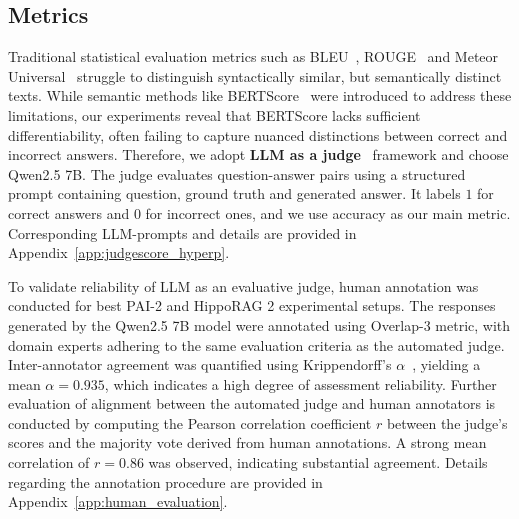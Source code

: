 \subsection{Metrics}

Traditional statistical evaluation metrics such as BLEU~\cite{papineni2002bleu}, ROUGE~\cite{lin2004rouge} and Meteor Universal~\cite{denkowski2014meteor} struggle to distinguish syntactically similar, but semantically distinct texts. While semantic methods like BERTScore~\cite{zhang2019bertscore} were introduced to address these limitations, our experiments reveal that BERTScore lacks sufficient differentiability, often failing to capture nuanced distinctions between correct and incorrect answers. Therefore, we adopt \textbf{LLM as a judge}~\cite{zheng2023judging} framework and choose Qwen2.5 7B. The judge evaluates question-answer pairs using a structured prompt containing question, ground truth and generated answer. It labels $1$ for correct answers and $0$ for incorrect ones, and we use accuracy as our main metric. Corresponding LLM-prompts and details are provided in Appendix~\ref{app:judgescore_hyperp}.

To validate reliability of LLM as an evaluative judge, human annotation was conducted for best PAI-2 and HippoRAG 2 experimental setups. The responses generated by the Qwen2.5 7B model were annotated using Overlap-3 metric, with domain experts adhering to the same evaluation criteria as the automated judge. Inter-annotator agreement was quantified using Krippendorff’s $\alpha$~\cite{Krippendorff2011ComputingKA}, yielding a mean $\alpha = 0.935$, which indicates a high degree of assessment reliability. Further evaluation of alignment between the automated judge and human annotators is conducted by computing the Pearson correlation coefficient $r$ between the judge’s scores and the majority vote derived from human annotations. A strong mean correlation of $r = 0.86$ was observed, indicating substantial agreement. Details regarding the annotation procedure are provided in Appendix~\ref{app:human_evaluation}.

